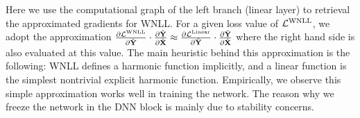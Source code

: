 \documentclass{article}
\newcommand\xmod[1]{{\textcolor{blue}{#1}}}
\begin{document}
Here we use the computational graph of the left branch (linear layer) to retrieval the approximated gradients for WNLL. For a given loss value of $\mathcal{L}^{\rm WNLL}$, we adopt the approximation
$\frac{\partial \mathcal{L}^{\rm WNLL}}{\partial \hat{\mathbf{Y}}}\cdot \frac{\partial \hat{\mathbf{Y}}}{\partial \hat{\mathbf{X}}} \approx \frac{\partial \mathcal{L}^{\rm Linear}}{\partial \tilde{\mathbf{Y}}}\cdot \frac{\partial \tilde{\mathbf{Y}}}{\partial \hat{\mathbf{X}}}$ where the right hand side is also evaluated at this value.
The main heuristic behind this approximation is the following: WNLL defines a harmonic function implicitly, and a linear function is the simplest nontrivial explicit harmonic function. Empirically, we observe this simple approximation works well in training the network. The reason why we freeze the network in the DNN block is mainly due to stability concerns. 



\end{document}
